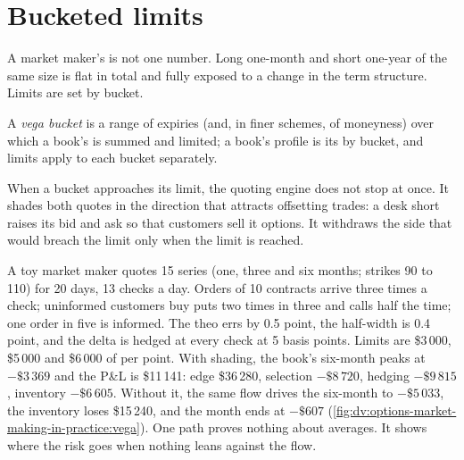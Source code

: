 \section{Bucketed limits}

A market maker's  is not one number. Long one-month and short one-year  of the same size is flat in total and fully exposed to a change in the term
structure. Limits are set by bucket.

\begin{definition}\label{def:dv:options-market-making-in-practice:bucket}
A \emph{vega bucket} is a range of expiries (and, in finer schemes, of moneyness) over which a book's  is summed and limited; a book's
 profile is its  by bucket, and limits apply to each bucket separately.
\end{definition}

When a bucket approaches its limit, the quoting engine does not stop at once. It shades both quotes in the direction that attracts offsetting trades: a desk
short  raises its bid and ask so that customers sell it options. It withdraws the side that would breach the limit only when the limit is reached.

\begin{example}\label{ex:dv:options-market-making-in-practice:toy}
A toy market maker quotes 15 series (one, three and six months; strikes 90 to 110) for 20 days, 13 checks a day. Orders of 10 contracts arrive three times a
check; uninformed customers buy puts two times in three and calls half the time; one order in five is informed. The theo errs by 0.5 point, the half-width is
0.4 point, and the delta is hedged at every check at 5 basis points. Limits are \$3\,000, \$5\,000 and \$6\,000 of  per point. With shading, the book's six-month
 peaks at $-\$3\,369$ and the P\&L is \$11\,141: edge \$36\,280, selection $-\$8\,720$, hedging $-\$9\,815$, inventory $-\$6\,605$. Without it, the same flow drives the
six-month  to $-\$5\,033$, the inventory loses \$15\,240, and the month ends at $-\$607$ (\cref{fig:dv:options-market-making-in-practice:vega}). One path proves
nothing about averages. It shows where the risk goes when nothing leans against the flow.
\end{example}

